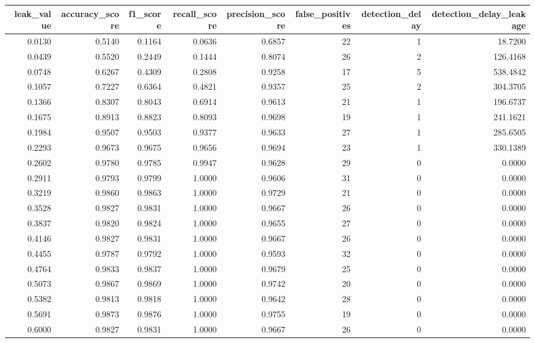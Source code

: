 \begin{tabular}{rrrrrrrr}
\toprule
leak\_value & accuracy\_score & f1\_score & recall\_score & precision\_score & false\_positives & detection\_delay & detection\_delay\_leakage \\
\midrule
0.0130 & 0.5140 & 0.1164 & 0.0636 & 0.6857 & 22 & 1 & 18.7200 \\
0.0439 & 0.5520 & 0.2449 & 0.1444 & 0.8074 & 26 & 2 & 126.4168 \\
0.0748 & 0.6267 & 0.4309 & 0.2808 & 0.9258 & 17 & 5 & 538.4842 \\
0.1057 & 0.7227 & 0.6364 & 0.4821 & 0.9357 & 25 & 2 & 304.3705 \\
0.1366 & 0.8307 & 0.8043 & 0.6914 & 0.9613 & 21 & 1 & 196.6737 \\
0.1675 & 0.8913 & 0.8823 & 0.8093 & 0.9698 & 19 & 1 & 241.1621 \\
0.1984 & 0.9507 & 0.9503 & 0.9377 & 0.9633 & 27 & 1 & 285.6505 \\
0.2293 & 0.9673 & 0.9675 & 0.9656 & 0.9694 & 23 & 1 & 330.1389 \\
0.2602 & 0.9780 & 0.9785 & 0.9947 & 0.9628 & 29 & 0 & 0.0000 \\
0.2911 & 0.9793 & 0.9799 & 1.0000 & 0.9606 & 31 & 0 & 0.0000 \\
0.3219 & 0.9860 & 0.9863 & 1.0000 & 0.9729 & 21 & 0 & 0.0000 \\
0.3528 & 0.9827 & 0.9831 & 1.0000 & 0.9667 & 26 & 0 & 0.0000 \\
0.3837 & 0.9820 & 0.9824 & 1.0000 & 0.9655 & 27 & 0 & 0.0000 \\
0.4146 & 0.9827 & 0.9831 & 1.0000 & 0.9667 & 26 & 0 & 0.0000 \\
0.4455 & 0.9787 & 0.9792 & 1.0000 & 0.9593 & 32 & 0 & 0.0000 \\
0.4764 & 0.9833 & 0.9837 & 1.0000 & 0.9679 & 25 & 0 & 0.0000 \\
0.5073 & 0.9867 & 0.9869 & 1.0000 & 0.9742 & 20 & 0 & 0.0000 \\
0.5382 & 0.9813 & 0.9818 & 1.0000 & 0.9642 & 28 & 0 & 0.0000 \\
0.5691 & 0.9873 & 0.9876 & 1.0000 & 0.9755 & 19 & 0 & 0.0000 \\
0.6000 & 0.9827 & 0.9831 & 1.0000 & 0.9667 & 26 & 0 & 0.0000 \\
\bottomrule
\end{tabular}
